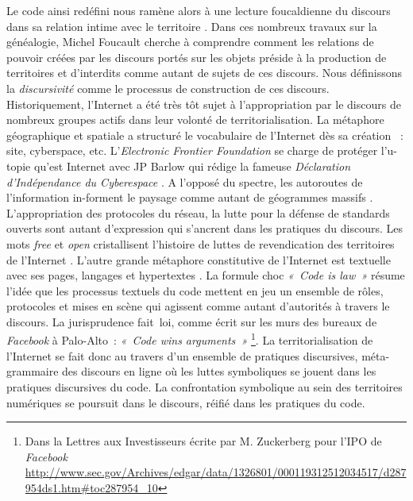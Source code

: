 Le code ainsi redéfini nous ramène alors à une lecture foucaldienne du discours dans sa relation intime avec le territoire \citep{Foucault2004}. Dans ces nombreux travaux sur la généalogie, Michel Foucault cherche à comprendre comment les relations de pouvoir créées par les discours portés sur les objets préside à la production de territoires et d’interdits comme autant de sujets de ces discours. Nous définissons la \textit{discursivité} comme le processus de construction de ces discours. Historiquement, l’Internet a été très tôt sujet à l’appropriation par le discours de nombreux groupes actifs dans leur volonté de territorialisation. La métaphore géographique et spatiale a structuré le vocabulaire de l’Internet dès sa création \citep{Graham1998} : site, cyberspace, etc. L’\textit{Electronic Frontier Foundation} se charge de protéger l’u-topie qu’est Internet avec JP Barlow qui rédige la fameuse \textit{Déclaration d’Indépendance du Cyberespace} \citep{Barlow2001}. A l’opposé du spectre, les autoroutes de l’information in-forment le paysage comme autant de géogrammes massifs \citep{Berque1999}. L’appropriation des protocoles du réseau, la lutte pour la défense de standards ouverts sont autant d’expression qui s’ancrent dans les pratiques du discours. Les mots \textit{free} et \textit{open} cristallisent l’histoire de luttes de revendication des territoires de l’Internet \citep{Blondeau2000}. L’autre grande métaphore constitutive de l’Internet est textuelle avec ses pages, langages et hypertextes \citep{Vandendorpe1999}. La formule choc \textit{« Code is law »} \citep{Lessig2006} résume l’idée  que les processus textuels du code mettent en jeu un ensemble de rôles, protocoles et mises en scène qui agissent comme autant d’autorités à travers le discours. La jurisprudence fait loi, comme écrit sur les murs des bureaux de \textit{Facebook} à Palo-Alto : \textit{« Code wins arguments »} \footnote{Dans la Lettres aux Investisseurs écrite par M. Zuckerberg  pour l’IPO de \textit{Facebook} \url{http://www.sec.gov/Archives/edgar/data/1326801/000119312512034517/d287954ds1.htm\#toc287954_10}}. La territorialisation de l’Internet se fait donc au travers d’un ensemble de pratiques discursives, méta-grammaire des discours en ligne où les luttes symboliques se jouent dans les pratiques discursives du code. La confrontation symbolique au sein des territoires numériques se poursuit dans le discours, réifié dans les pratiques du code.

